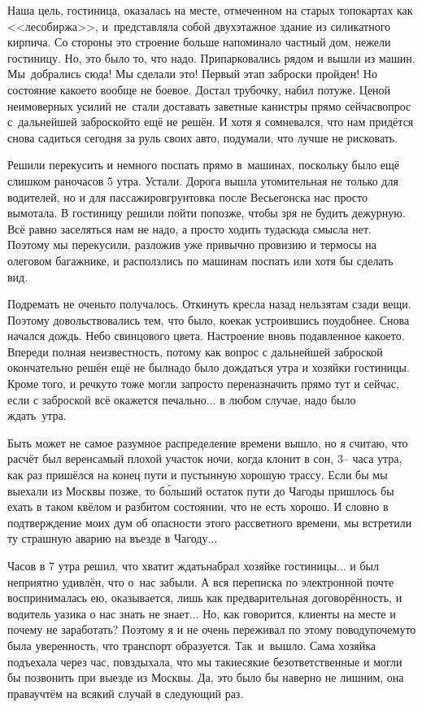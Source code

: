 Наша цель, гостиница, оказалась на месте, отмеченном на старых топокартах как <<лесобиржа>>, и~представляла собой двухэтажное здание из силикатного кирпича. Со стороны это строение больше напоминало частный дом, нежели гостиницу. Но, это было то, что надо. Припарковались рядом и вышли из машин. Мы~добрались сюда! Мы сделали это! Первый этап заброски пройден! Но состояние какое\sdash то вообще не боевое. Достал трубочку, набил потуже. Ценой неимоверных усилий не~стали доставать заветные канистры прямо сейчас\mdash вопрос с~дальнейшей заброской\sdash то ещё не решён. И хотя я сомневался, что нам придётся снова садиться сегодня за руль своих авто, подумали, что лучше не рисковать. 

Решили перекусить и немного поспать прямо в~машинах, поскольку было ещё слишком рано\mdash часов 5 утра. Устали. Дорога вышла утомительная не только для водителей, но и для пассажиров\mdash грунтовка после Весьегонска нас просто вымотала. В гостиницу решили пойти попозже, чтобы зря не будить дежурную. Всё равно заселяться нам не надо, а просто ходить туда\sdash сюда смысла нет. Поэтому мы перекусили, разложив уже привычно провизию и термосы на олеговом багажнике, и расползлись по машинам поспать или хотя бы сделать вид. 

Подремать не очень\sdash то получалось. Откинуть кресла назад нельзя\mdash там сзади вещи. Поэтому довольствовались тем, что было, кое\sdash как устроившись поудобнее. Снова начался дождь. Небо свинцового цвета. Настроение вновь подавленное какое\sdash то. Впереди полная неизвестность, потому как вопрос с дальнейшей заброской окончательно решён ещё не был\mdash надо было дождаться утра и хозяйки гостиницы. Кроме того, и речку\sdash то тоже могли запросто переназначить прямо тут и сейчас, если с заброской всё окажется печально$\ldots$ в любом случае, надо было ждать~утра. 

Быть может не самое разумное распределение времени вышло, но я считаю, что расчёт был верен\mdash самый плохой участок ночи, когда клонит в сон, 3\thinspace\nobreakdash-- часа утра, как раз пришёлся на конец пути и пустынную хорошую трассу. Если бы мы выехали из Москвы позже, то б\'{о}льший остаток пути до Чагоды пришлось бы ехать в таком квёлом и разбитом состоянии, что не есть хорошо. И словно в подтверждение моих дум об опасности этого рассветного времени, мы встретили ту страшную аварию на въезде в Чагоду$\ldots$

Часов в 7 утра решил, что хватит ждать\mdash набрал хозяйке гостиницы$\ldots$ и был неприятно удивлён, что о~нас забыли. А вся переписка по электронной почте воспринималась ею, оказывается, лишь как предварительная договорённость, и водитель уазика о нас знать не знает$\ldots$ Но, как говорится, клиенты на месте и почему не заработать? Поэтому я и не очень переживал по этому поводу\mdash почему\sdash то была уверенность, что транспорт образуется. Так~и~вышло. Сама хозяйка подъехала через час, повздыхала, что мы такие\sdash сякие безответственные и могли бы позвонить при выезде из Москвы. Да, это было бы наверно не лишним, она права\mdash учтём на всякий случай в следующий раз. 

